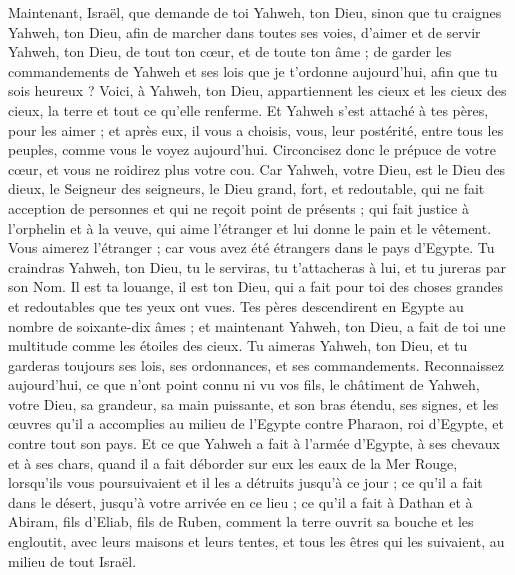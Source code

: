 \begin{multicols}{2}
Maintenant, Israël, que demande de toi Yahweh, ton Dieu, sinon que tu craignes Yahweh, ton Dieu, afin de marcher dans toutes ses voies, d'aimer et de servir Yahweh, ton Dieu, de tout ton cœur, et de toute ton âme ;
de garder les commandements de Yahweh et ses lois que je t'ordonne aujourd'hui, afin que tu sois heureux ?
Voici, à Yahweh, ton Dieu, appartiennent les cieux et les cieux des cieux, la terre et tout ce qu'elle renferme.
Et Yahweh s'est attaché à tes pères, pour les aimer ; et après eux, il vous a choisis, vous, leur postérité, entre tous les peuples, comme vous le voyez aujourd'hui.
Circoncisez donc le prépuce de votre cœur, et vous ne roidirez plus votre cou.
Car Yahweh, votre Dieu, est le Dieu des dieux, le Seigneur des seigneurs, le Dieu grand, fort, et redoutable, qui ne fait acception de personnes et qui ne reçoit point de présents ;
qui fait justice à l'orphelin et à la veuve, qui aime l'étranger et lui donne le pain et le vêtement.
Vous aimerez l'étranger ; car vous avez été étrangers dans le pays d'Egypte.
Tu craindras Yahweh, ton Dieu, tu le serviras, tu t'attacheras à lui, et tu jureras par son Nom.
Il est ta louange, il est ton Dieu, qui a fait pour toi des choses grandes et redoutables que tes yeux ont vues.
Tes pères descendirent en Egypte au nombre de soixante-dix âmes ; et maintenant Yahweh, ton Dieu, a fait de toi une multitude comme les étoiles des cieux.
\VerseOne{}Tu aimeras Yahweh, ton Dieu, et tu garderas toujours ses lois, ses ordonnances, et ses commandements.
Reconnaissez aujourd'hui, ce que n'ont point connu ni vu vos fils, le châtiment de Yahweh, votre Dieu, sa grandeur, sa main puissante, et son bras étendu,
ses signes, et les œuvres qu'il a accomplies au milieu de l'Egypte contre Pharaon, roi d'Egypte, et contre tout son pays.
Et ce que Yahweh a fait à l'armée d'Egypte, à ses chevaux et à ses chars, quand il a fait déborder sur eux les eaux de la Mer Rouge, lorsqu'ils vous poursuivaient et il les a détruits jusqu'à ce jour ;
ce qu'il a fait dans le désert, jusqu'à votre arrivée en ce lieu ;
ce qu'il a fait à Dathan et à Abiram, fils d'Eliab, fils de Ruben, comment la terre ouvrit sa bouche et les engloutit, avec leurs maisons et leurs tentes, et tous les êtres qui les suivaient, au milieu de tout Israël.

\end{multicols}
